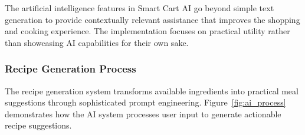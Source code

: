 \documentclass[11pt,a4paper]{article}
\begin{document}
The artificial intelligence features in Smart Cart AI go beyond simple text generation to provide contextually relevant assistance that improves the shopping and cooking experience. The implementation focuses on practical utility rather than showcasing AI capabilities for their own sake.

\subsubsection{Recipe Generation Process}

The recipe generation system transforms available ingredients into practical meal suggestions through sophisticated prompt engineering. Figure~\ref{fig:ai_process} demonstrates how the AI system processes user input to generate actionable recipe suggestions.
\end{document}
